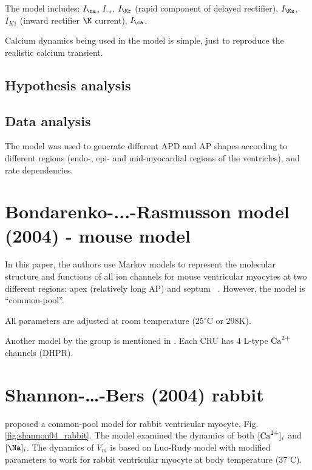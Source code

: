 The model includes: $I_\na$, $I_{\to}$, $I_{\Kr}$ (rapid component of delayed
rectifier), $I_\Ks$, $I_{K1}$ (inward rectifier $\K$ current), $I_\ca$.


Calcium dynamics being used in the model is simple, just to reproduce the
realistic calcium transient.

\subsection{Hypothesis analysis}

\subsection{Data analysis}

The model was used to generate different APD and AP shapes according to
different regions (endo-, epi- and mid-myocardial regions of the ventricles),
and rate dependencies.

\section{Bondarenko-...-Rasmusson model (2004) - mouse model}
\label{sec:bond-rasm}

In this paper, the authors use Markov models to represent the
molecular structure and functions of all ion
channels for mouse ventricular myocytes at two
different regions: apex (relatively long AP) and septum
~\citep{bondarenko2004cma}. However, the model is ``common-pool''.

All parameters are adjusted at room temperature (25$^\circ$C or 298K).

Another model by the group is mentioned in \citep{bondarenko2004mgc}.
Each CRU has 4 L-type ${\text{Ca}^{2+}}$ channels (DHPR).




\section{Shannon-\ldots-Bers (2004) rabbit}
\label{sec:shannon_2004_rabbit}

\citep{shannon2004} proposed a common-pool model for rabbit ventricular
myocyte, Fig.\ref{fig:shannon04_rabbit}. The model examined the dynamics of both
$[{\text{Ca}^{2+}}]_i$ and $[\Na]_i$. The dynamics of $V_m$ is based on Luo-Rudy model
\citep{luo1994dmc_a,luo1994dmc_b} with modified parameters to work for rabbit
ventricular myocyte at body temperature (37$^\circ$C).


